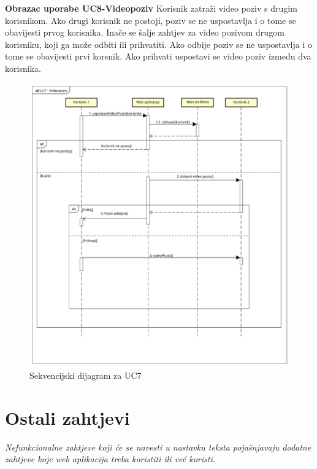 				\eject
				
				\noindent
				\textbf{Obrazac uporabe UC8-Videopoziv}\newline
				{Korisnik zatraži video poziv s drugim korisnikom. Ako drugi korisnik ne postoji, poziv se ne uspostavlja i o tome se obavijesti prvog korisnika. Inače se šalje zahtjev za video pozivom drugom korisniku, koji ga može odbiti ili prihvatiti. Ako odbije poziv se ne uspostavlja i o tome se obavijesti prvi korsnik. Ako prihvati uspostavi se video poziv između dva korisnika.}
				
				
				\begin{figure}[H]
					\includegraphics[scale= 0.5]{slike/sekvencijski_dijagramUC7.png}
					\centering
					\caption{Sekvencijski dijagram za UC7}
					\label{fig:Sekvencijski dijagram za UC7}
				\end{figure}
				
				\eject
				
				\section{Ostali zahtjevi}
				
				\textit{Nefunkcionalne zahtjeve koji će se navesti u nastavku teksta pojašnjavaju dodatne zahtjeve koje web aplikacija treba koristiti ili već koristi.}
				
